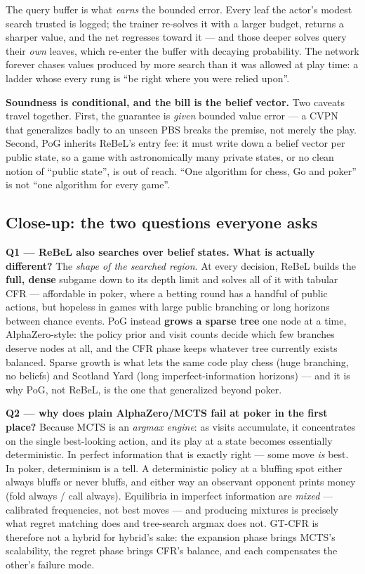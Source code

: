 \documentclass[11pt,a4paper]{article}
\begin{document}
The query buffer is what \emph{earns} the bounded error. Every leaf the actor's
modest search trusted is logged; the trainer re-solves it with a larger budget,
returns a sharper value, and the net regresses toward it --- and those deeper
solves query their \emph{own} leaves, which re-enter the buffer with decaying
probability. The network forever chases values produced by more search than it
was allowed at play time: a ladder whose every rung is ``be right where you were
relied upon''.

\begin{trap}
\textbf{Soundness is conditional, and the bill is the belief vector.} Two caveats
travel together. First, the guarantee is \emph{given} bounded value error --- a
CVPN that generalizes badly to an unseen PBS breaks the premise, not merely the
play. Second, PoG inherits ReBeL's entry fee: it must write down a belief vector
per public state, so a game with astronomically many private states, or no clean
notion of ``public state'', is out of reach. ``One algorithm for chess, Go and
poker'' is not ``one algorithm for every game''.
\end{trap}

\subsection{Close-up: the two questions everyone asks}

\textbf{Q1 --- ReBeL also searches over belief states. What is actually
different?} The \emph{shape of the searched region}. At every decision,
ReBeL builds the \textbf{full, dense} subgame down to its depth limit and
solves all of it with tabular CFR --- affordable in poker, where a betting
round has a handful of public actions, but hopeless in games with large
public branching or long horizons between chance events. PoG instead
\textbf{grows a sparse tree} one node at a time, AlphaZero-style: the policy
prior and visit counts decide which few branches deserve nodes at all,
and the CFR phase keeps whatever tree currently exists balanced. Sparse
growth is what lets the same code play chess (huge branching, no beliefs)
and Scotland Yard (long imperfect-information horizons) --- and it is why
PoG, not ReBeL, is the one that generalized beyond poker.

\textbf{Q2 --- why does plain AlphaZero/MCTS fail at poker in the first
place?} Because MCTS is an \emph{argmax engine}: as visits accumulate, it
concentrates on the single best-looking action, and its play at a state
becomes essentially deterministic. In perfect information that is exactly
right --- some move \emph{is} best. In poker, determinism is a tell. A
deterministic policy at a bluffing spot either always bluffs or never
bluffs, and either way an observant opponent prints money (fold always /
call always). Equilibria in imperfect information are \emph{mixed} ---
calibrated frequencies, not best moves --- and producing mixtures is
precisely what regret matching does and tree-search argmax does not. GT-CFR
is therefore not a hybrid for hybrid's sake: the expansion phase brings
MCTS's scalability, the regret phase brings CFR's balance, and each
compensates the other's failure mode.
\end{document}
